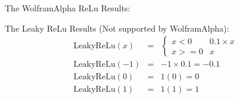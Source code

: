 \begin{center}
    The WolframAlpha ReLu Results: \\
    \begin{figure}[H]
        \centering
        \qquad
        \qquad
    \end{figure}

    The Leaky ReLu Results (Not supported by WolframAlpha): \\
    \begin{eqnarray*}
        \text{LeakyReLu}(x) &=&  \begin{cases}
            x < 0 & 0.1 \times x \\
            x >= 0 & x
        \end{cases} \\
        \text{LeakyReLu}(-1) &=& -1 \times 0.1 = -0.1 \\
        \text{LeakyReLu}(0) &=& 1(0) = 0 \\
        \text{LeakyReLu}(1) &=& 1(1) = 1 \\
    \end{eqnarray*}


\end{center}
